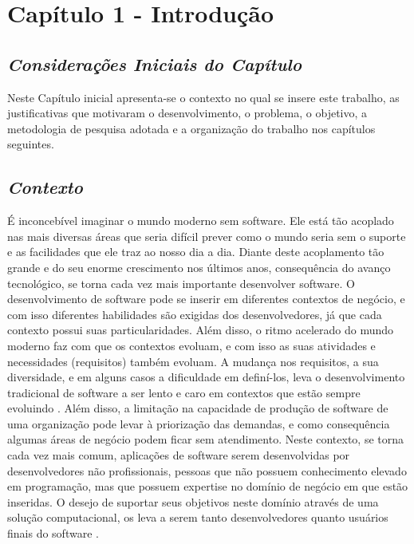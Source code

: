 \chapter[Capítulo 1 - Introdução]{Capítulo 1 - Introdução}

\section{\textit{Considerações Iniciais do Capítulo}}

Neste Capítulo inicial apresenta-se o contexto no qual se insere este trabalho, as
justificativas que motivaram o desenvolvimento, o problema, o objetivo, a
metodologia de pesquisa adotada e a organização do trabalho nos capítulos seguintes.

\section{\textit{Contexto}}

É inconcebível imaginar o mundo moderno sem software. Ele está tão acoplado nas mais diversas áreas que seria difícil prever como o mundo seria sem o suporte e as facilidades que ele traz ao nosso dia a dia. Diante deste acoplamento tão grande e do seu enorme crescimento nos últimos anos, consequência do avanço tecnológico, se torna cada vez mais importante desenvolver software. O desenvolvimento de software pode se inserir em diferentes contextos de negócio, e com isso diferentes habilidades são exigidas dos desenvolvedores, já que cada contexto possui suas particularidades. Além disso, o ritmo acelerado do mundo moderno faz com que os contextos evoluam, e com isso as suas atividades e necessidades (requisitos) também evoluam. A mudança nos requisitos, a sua diversidade, e em alguns casos a dificuldade em definí-los, leva o desenvolvimento tradicional de software a ser lento e caro em contextos que estão sempre evoluindo \cite{lieberman2006}. Além disso, a limitação na capacidade de produção de software de uma organização pode levar à priorização das demandas, e como consequência algumas áreas de negócio podem ficar sem atendimento. Neste contexto, se torna cada vez mais comum, aplicações de software serem desenvolvidas por desenvolvedores não profissionais, pessoas que não possuem conhecimento elevado em programação, mas que possuem expertise no domínio de negócio em que estão inseridas. O desejo de suportar seus objetivos neste domínio através de uma solução computacional, os leva a serem tanto desenvolvedores quanto usuários finais do software \cite{lieberman2006}.

